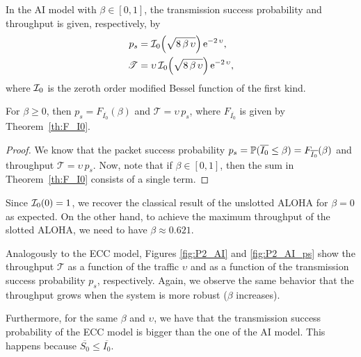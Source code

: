 \begin{proposition}
In the AI model with $\beta\in[0,1]$, the transmission success probability and throughput is given, respectively, by
\begin{align*}
    p_s &= \cal{I}_0\!\left( \sqrt{8\,\beta\,\upsilon} \right) \euler^{-2\,\upsilon},\\
	\mathscr{T} &= \upsilon\,\cal{I}_0\!\left( \sqrt{8\,\beta\,\upsilon} \right) \euler^{-2\,\upsilon},
\end{align*}
where $\cal{I}_0$ is the zeroth order modified Bessel function of the first kind.

For $\beta \ge 0$, then $p_s = F_{\overline{I_0}}(\beta)$ and $\mathscr{T} = \upsilon\,p_s$, where $F_{\overline{I_0}}$ is given by Theorem~\ref{th:F_I0}.
\end{proposition}

\begin{proof}
We know that the packet success probability $p_s = \P(\overline{I_0}\leq \beta) = F_{\overline{I_0}}(\beta)$ and throughput $\mathscr{T} = \upsilon\,p_s$.
%
Now, note that if $\beta\in[0,1]$, then the sum in Theorem~\ref{th:F_I0} consists of a single term.
\end{proof}

Since $\cal{I}_0(0) = 1$, we recover the classical result of the unslotted ALOHA for $\beta = 0$ as expected.
%
On the other hand, to achieve the maximum throughput of the slotted ALOHA, we need to have $\beta\approx0.621$.

Analogously to the ECC model, Figures \ref{fig:P2_AI} and \ref{fig:P2_AI_ps} show the throughput $\mathscr{T}$ as a function of the traffic $\upsilon$ and as a function of the transmission success probability $p_s$, respectively.
%
Again, we observe the same behavior that the throughput grows when the system is more robust ($\beta$ increases).

Furthermore, for the same $\beta$ and $\upsilon$, we have that the transmission success probability of the ECC model is bigger than the one of the AI model. This happens because $\overline{S_0} \le \overline{I_0}$.

